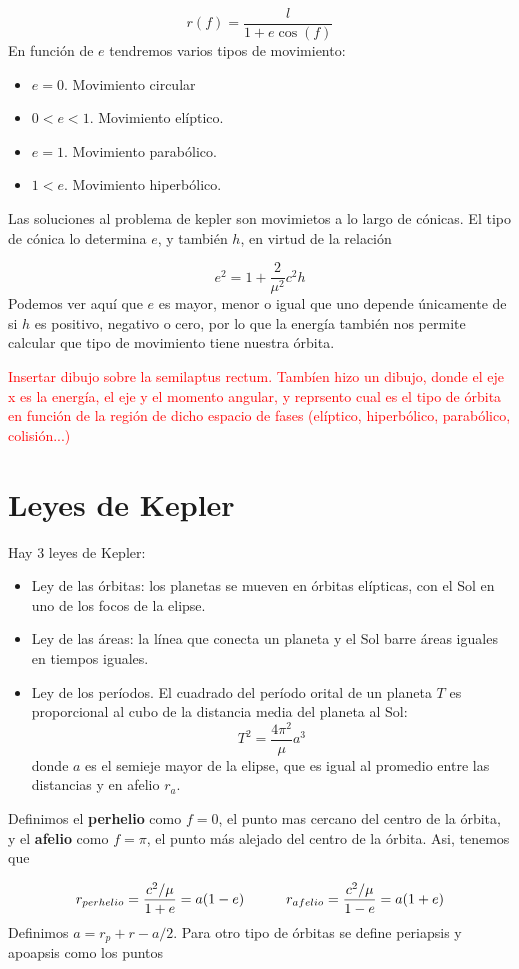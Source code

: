 \begin{equation}
    r(f) = \frac{l}{1+e\cos(f)}
\end{equation}
En función de $e$ tendremos varios tipos de movimiento: 

\begin{itemize}
    \item $e=0$. Movimiento circular
    \item $0<e<1$. Movimiento elíptico.
    \item $e=1$. Movimiento parabólico.
    \item $1<e$. Movimiento hiperbólico.
\end{itemize}
Las soluciones al problema de kepler son movimietos a lo largo de cónicas. El tipo de cónica lo determina $e$, y también $h$, en virtud de la relación

\begin{equation}
    e^2 = 1 + \frac{2}{\mu^2} c^2 h
\end{equation}
Podemos ver aquí que $e$ es mayor, menor o igual que uno depende únicamente de si $h$ es positivo, negativo o cero, por lo que la energía también nos permite calcular que tipo de movimiento tiene nuestra órbita.
\begin{Anotacion}
    \textcolor{red}{Insertar dibujo sobre la semilaptus rectum. Tambíen hizo un dibujo, donde el eje x es la energía, el eje y el momento angular, y reprsento cual es el tipo de órbita en función de la región de dicho espacio de fases (elíptico, hiperbólico, parabólico, colisión...)}
\end{Anotacion}

\section{Leyes de Kepler}

Hay 3 leyes de Kepler:

\begin{itemize}
    \item Ley de las órbitas: los planetas se mueven en órbitas elípticas, con el Sol en uno de los focos de la elipse. 
    \item Ley de las áreas: la línea que conecta un planeta y el Sol barre áreas iguales en tiempos iguales.
    \item Ley de los períodos. El cuadrado del período orital de un planeta $T$ es proporcional al cubo de la distancia media del planeta al Sol: 
    \begin{equation}
        T^2 = \frac{4\pi^2}{\mu}a^3
    \end{equation}
    donde $a$ es el semieje mayor de la elipse, que es igual al promedio entre las distancias y en afelio $r_a$. 
\end{itemize}
Definimos el \textbf{perhelio} como $f=0$, el punto mas cercano del centro de la órbita, y el \textbf{afelio} como $f=\pi$, el punto más alejado del centro de la órbita. Asi, tenemos que 

\begin{equation}
    r_{perhelio} = \frac{c^2/\mu}{1+e} = a(1-e) \quad \quad \quad r_{afelio} = \frac{c^2/\mu}{1-e} = a(1+e)
\end{equation}
Definimos $a=r_p+r-a/2$. Para otro tipo de órbitas se define periapsis y apoapsis como los puntos 

